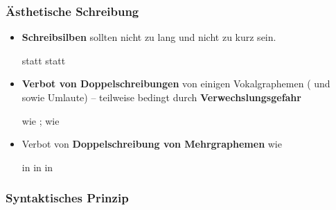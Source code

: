 \begin{frame}
\frametitle{Ästhetische Schreibung}

\begin{itemize}
	\item \textbf{Schreibsilben} sollten nicht zu lang und nicht zu kurz sein.
	
	\eal
	\ex {} statt 
	\ex {} statt 
	\zl

\pause 
	
	\item \textbf{Verbot von Doppelschreibungen} von einigen Vokalgraphemen ( und  sowie Umlaute) -- teilweise bedingt durch \textbf{Verwechslungsgefahr}
	
	\ea
	 wie ;  wie 
	\z
	
\pause 
		
	\item Verbot von \textbf{Doppelschreibung von Mehrgraphemen} wie
	
	\eal
		\ex {} in 
		\ex {} in  
		\ex {} in 
	\zl
	
\end{itemize}

\end{frame}


\subsubsection{Syntaktisches Prinzip}


